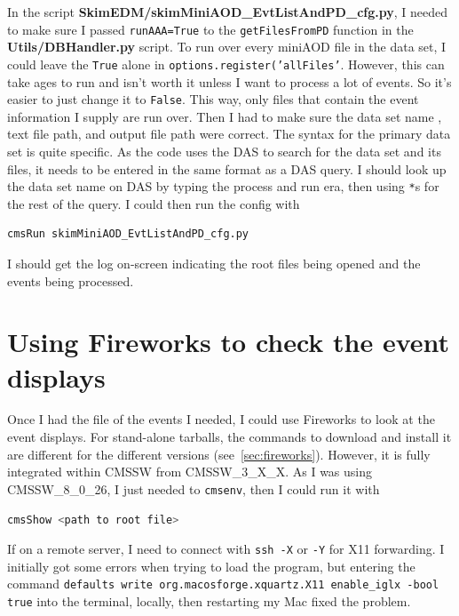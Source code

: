 In the script \textbf{SkimEDM/skimMiniAOD\_EvtListAndPD\_cfg.py}, I needed to make sure I passed \texttt{runAAA=True} to the \texttt{getFilesFromPD} function in the \textbf{Utils/DBHandler.py} script. To run over every miniAOD file in the data set, I could leave the \texttt{True} alone in \texttt{options.register('allFiles'}. However, this can take ages to run and isn't worth it unless I want to process a lot of events. So it's easier to just change it to \texttt{False}. This way, only files that contain the event information I supply are run over. Then I had to make sure the data set name , text file path, and output file path were correct. The syntax for the primary data set is quite specific. As the code uses the DAS to search for the data set and its files, it needs to be entered in the same format as a DAS query. I should look up the data set name on DAS by typing the process and run era, then using \verb!*!s for the rest of the query. I could then run the config with

\begin{lstlisting}[belowskip=-0.7cm, language=sh, numbers=none]
cmsRun skimMiniAOD_EvtListAndPD_cfg.py
\end{lstlisting}

I should get the log on-screen indicating the root files being opened and the events being processed.


\section{Using Fireworks to check the event displays}

Once I had the \ROOT file of the events I needed, I could use Fireworks to look at the event displays. For stand-alone tarballs, the commands to download and install it are different for the different versions (see~\ref{sec:fireworks}). However, it is fully integrated within CMSSW from CMSSW\_3\_X\_X. As I was using CMSSW\_8\_0\_26, I just needed to \texttt{cmsenv}, then I could run it with

\begin{lstlisting}[belowskip=-0.7cm, language=sh, numbers=none]
cmsShow <path to root file>
\end{lstlisting}

If on a remote server, I need to connect with \texttt{ssh -X} or \texttt{-Y} for X11 forwarding. I initially got some errors when trying to load the program, but entering the command \texttt{defaults write org.macosforge.xquartz.X11 enable\_iglx -bool true} into the terminal, locally, then restarting my Mac fixed the problem.

